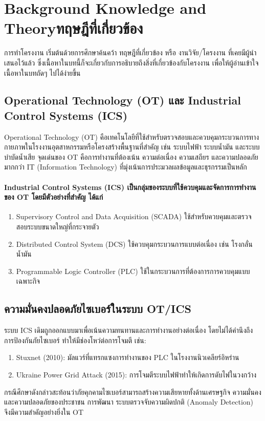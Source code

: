 \chapter{\ifenglish Background Knowledge and Theory\else ทฤษฎีที่เกี่ยวข้อง\fi}

การทำโครงงาน เริ่มต้นด้วยการศึกษาค้นคว้า ทฤษฎีที่เกี่ยวข้อง หรือ งานวิจัย/โครงงาน ที่เคยมีผู้นำเสนอไว้แล้ว ซึ่งเนื้อหาในบทนี้ก็จะเกี่ยวกับการอธิบายถึงสิ่งที่เกี่ยวข้องกับโครงงาน เพื่อให้ผู้อ่านเข้าใจเนื้อหาในบทถัดๆ ไปได้ง่ายขึ้น

\section{Operational Technology (OT) และ Industrial Control Systems (ICS)}

\hspace{2em} Operational Technology (OT) คือเทคโนโลยีที่ใช้สำหรับตรวจสอบและควบคุมกระบวนการทางกายภาพในโรงงานอุตสาหกรรมหรือโครงสร้างพื้นฐานที่สำคัญ เช่น ระบบไฟฟ้า ระบบน้ำมัน และระบบบำบัดน้ำเสีย จุดเด่นของ OT คือการทำงานที่ต้องเน้น ความต่อเนื่อง ความเสถียร และความปลอดภัย มากกว่า IT (Information Technology) ที่มุ่งเน้นการประมวลผลข้อมูลและธุรกรรมเป็นหลัก

\subsubsection*{Industrial Control Systems (ICS) เป็นกลุ่มของระบบที่ใช้ควบคุมและจัดการการทำงานของ OT โดยมีตัวอย่างที่สำคัญ ได้แก่}
\begin{enumerate}
  \item Supervisory Control and Data Acquisition (SCADA) ใช้สำหรับควบคุมและตรวจสอบระบบขนาดใหญ่ที่กระจายตัว
  \item Distributed Control System (DCS) ใช้ควบคุมกระบวนการแบบต่อเนื่อง เช่น โรงกลั่นน้ำมัน
  \item Programmable Logic Controller (PLC) ใช้ในกระบวนการที่ต้องการการควบคุมแบบเฉพาะกิจ
\end{enumerate}

\section{ความมั่นคงปลอดภัยไซเบอร์ในระบบ OT/ICS}

\hspace{2em} ระบบ ICS เดิมถูกออกแบบมาเพื่อเน้นความทนทานและการทำงานอย่างต่อเนื่อง โดยไม่ได้คำนึงถึงการป้องกันภัยไซเบอร์ ทำให้มีช่องโหว่ต่อการโจมตี เช่น:
\begin{enumerate}
  \item Stuxnet (2010): มัลแวร์ที่แทรกแซงการทำงานของ PLC ในโรงงานนิวเคลียร์อิหร่าน
  \item Ukraine Power Grid Attack (2015): การโจมตีระบบไฟฟ้าทำให้เกิดการดับไฟในวงกว้าง
\end{enumerate}
\indent
กรณีศึกษาดังกล่าวสะท้อนว่าภัยคุกคามไซเบอร์สามารถสร้างความเสียหายทั้งด้านเศรษฐกิจ ความมั่นคง และความปลอดภัยของประชาชน การพัฒนา ระบบตรวจจับความผิดปกติ (Anomaly Detection) จึงมีความสำคัญอย่างยิ่งใน OT

